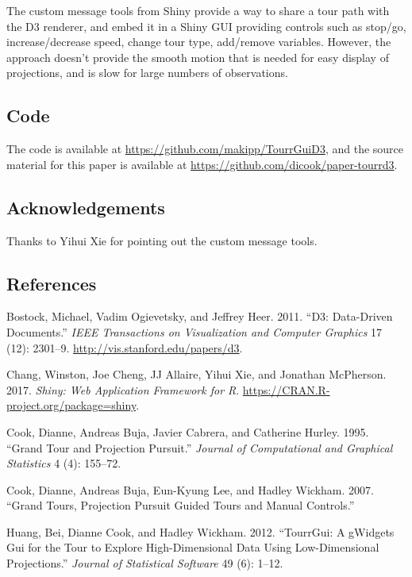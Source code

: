 The custom message tools from Shiny provide a way to share a tour path
with the D3 renderer, and embed it in a Shiny GUI providing controls
such as stop/go, increase/decrease speed, change tour type, add/remove
variables. However, the approach doesn't provide the smooth motion that
is needed for easy display of projections, and is slow for large numbers
of observations.

\hypertarget{code}{%
\subsection{Code}\label{code}}

The code is available at \url{https://github.com/makipp/TourrGuiD3}, and
the source material for this paper is available at
\url{https://github.com/dicook/paper-tourrd3}.

\hypertarget{acknowledgements}{%
\subsection{Acknowledgements}\label{acknowledgements}}

Thanks to Yihui Xie for pointing out the custom message tools.

\hypertarget{references}{%
\subsection{References}\label{references}}

\hypertarget{refs}{}
\leavevmode\hypertarget{ref-D3}{}%
Bostock, Michael, Vadim Ogievetsky, and Jeffrey Heer. 2011. ``D3:
Data-Driven Documents.'' \emph{IEEE Transactions on Visualization and
Computer Graphics} 17 (12): 2301--9.
\url{http://vis.stanford.edu/papers/d3}.

\leavevmode\hypertarget{ref-shiny}{}%
Chang, Winston, Joe Cheng, JJ Allaire, Yihui Xie, and Jonathan
McPherson. 2017. \emph{Shiny: Web Application Framework for R}.
\url{https://CRAN.R-project.org/package=shiny}.

\leavevmode\hypertarget{ref-gt_pp}{}%
Cook, Dianne, Andreas Buja, Javier Cabrera, and Catherine Hurley. 1995.
``Grand Tour and Projection Pursuit.'' \emph{Journal of Computational
and Graphical Statistics} 4 (4): 155--72.

\leavevmode\hypertarget{ref-gt_pp_mc}{}%
Cook, Dianne, Andreas Buja, Eun-Kyung Lee, and Hadley Wickham. 2007.
``Grand Tours, Projection Pursuit Guided Tours and Manual Controls.''

\leavevmode\hypertarget{ref-tourrGui}{}%
Huang, Bei, Dianne Cook, and Hadley Wickham. 2012. ``TourrGui: A
gWidgets Gui for the Tour to Explore High-Dimensional Data Using
Low-Dimensional Projections.'' \emph{Journal of Statistical Software} 49
(6): 1--12.

